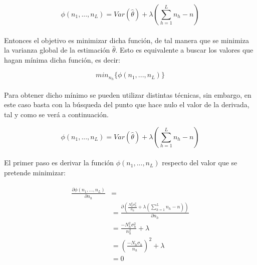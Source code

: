 \documentclass{article}
\begin{document}
      \begin{equation}
        \phi(n_1, ..., n_L) = Var(\widehat{\theta}) + \lambda \left( \sum_{h=1}^L n_h - n\right)
      \end{equation}

      \paragraph{}

      Entonces el objetivo es minimizar dicha función, de tal manera que se minimiza la varianza global de la estimación $\widehat{\theta}$. Esto es equivalente a buscar los valores que hagan mínima dicha función, es decir:

      \begin{equation}
        min_{n_h}\{\phi(n_1, ..., n_L)\}
      \end{equation}

      \paragraph{}
      Para obtener dicho mínimo se pueden utilizar distintas técnicas, sin embargo, en este caso basta con la búsqueda del punto que hace nulo el valor de la derivada, tal y como se verá a continuación.

      \begin{equation}
        \phi(n_1, ..., n_L) = Var(\widehat{\theta}) + \lambda \left( \sum_{h=1}^L n_h - n\right)
      \end{equation}


      \paragraph{}
      El primer paso es derivar la función $\phi(n_1, ..., n_L)$ respecto del valor que se pretende minimizar:

      \begin{align}
      \label{eq:derivate_1}
        \begin{split}
          \frac{\partial \phi(n_1, ..., n_L)}{\partial n_h} &= \\
          &= \frac{\partial\left( \frac{N_h^2 \sigma_h^{2}}{n_h}
          + \lambda \left( \sum_{h=1}^L n_h - n\right)\right) }{\partial n_h} \\
          &= \frac{-N_h^2 \sigma_h^{2}}{n_h^2} +\lambda \\
          &= \left(\frac{-N_h \sigma_h}{n_h}\right)^2 +\lambda \\
          &= 0
        \end{split}
      \end{align}
\end{document}
